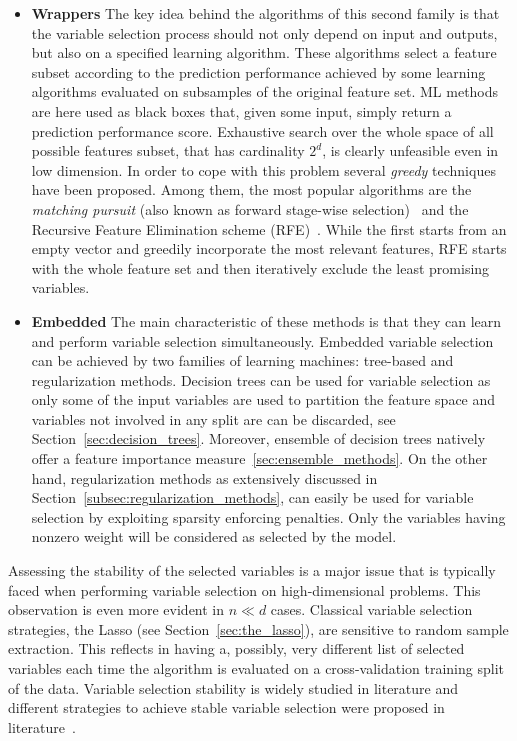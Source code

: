 \begin{itemize}
		\item[] \textbf{Wrappers}
		The key idea behind the algorithms of this second family is that the variable selection process should not only depend on input and outputs, but also on a specified learning algorithm. These algorithms select a feature subset according to the prediction performance achieved by some learning algorithms evaluated on subsamples of the original feature set. ML methods are here used as black boxes that, given some input, simply return a prediction performance score.
		Exhaustive search over the whole space of all possible features subset, that has cardinality $2^d$, is clearly unfeasible even in low dimension. In order to cope with this problem several \textit{greedy} techniques have been proposed. Among them, the most popular algorithms are the \textit{matching pursuit} (also known as forward stage-wise selection)~\cite{cai2011orthogonal} and the Recursive Feature Elimination scheme (RFE)~\cite{guyon2002gene}.
		While the first starts from an empty vector and greedily incorporate the most relevant features, RFE starts with the whole feature set and then iteratively exclude the least promising variables.
		
		\item[] \textbf{Embedded}
		The main characteristic of these methods is that they can learn and perform variable selection simultaneously.
		Embedded variable selection can be achieved by two families of learning machines: tree-based and regularization methods.
		Decision trees can be used for variable selection as only some of the input variables are used to partition the feature space and variables not involved in any split are can be discarded, see Section~\ref{sec:decision_trees}. Moreover, ensemble of decision trees natively offer a feature importance measure~\ref{sec:ensemble_methods}.
		On the other hand, regularization methods as extensively discussed in Section~\ref{subsec:regularization_methods}, can easily be used for variable selection by exploiting sparsity enforcing penalties. Only the variables having nonzero weight will be considered as selected by the model.
		
	\end{itemize}

	Assessing the stability of the selected variables is a major issue that is typically faced when performing variable selection on high-dimensional problems. This observation is even more evident in $n \ll d$ cases. Classical variable selection strategies, \eg the Lasso (see Section~\ref{sec:the_lasso}), are sensitive to random sample extraction.
	This reflects in having a, possibly, very different list of selected variables each time the algorithm is evaluated on a cross-validation training split of the data.
	Variable selection stability is widely studied in literature and different strategies to achieve stable variable selection were proposed in literature~\cite{kuncheva2007stability, de2009elastic, hofner2015controlling, nogueira2016measuring}.
	

